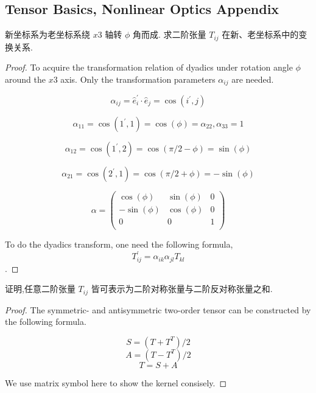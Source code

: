 \subsection{Tensor Basics, Nonlinear Optics Appendix}

\begin{exercise}
新坐标系为老坐标系绕 $x3$ 轴转 $\phi$ 角而成. 求二阶张量 $T_{ij}$ 在新、老坐标系中的变换关系.

\end{exercise}

\begin{proof}
    To acquire the transformation relation of dyadics under rotation angle $\phi$ around the $x3$ axis. Only the transformation parameters $\alpha_{ij}$ are needed. 
    
    $$
    \alpha_{i j}=\hat{e}_{i}^{\prime} \cdot \hat{e}_{j}=\cos \left(i^{\prime}, j\right)
    $$

    $$
    \alpha_{1 1}=\cos (1^{\prime}, 1)=\cos (\phi) = \alpha_{2 2}, \alpha_{3 3} =1
    $$
    
    $$
    \alpha_{1 2}=\cos (1^{\prime}, 2)=\cos (\pi/2-\phi) = \sin (\phi)
    $$

    $$
    \alpha_{2 1}=\cos (2^{\prime}, 1)=\cos (\pi/2+\phi) = -\sin (\phi)
    $$

    $$
    \alpha =
    \left ( 
        \begin{matrix}
        \cos (\phi) & \sin (\phi) & 0\\
        -\sin (\phi) & \cos (\phi) & 0\\
        0 & 0 & 1 \\
        \end{matrix}
    \right )
    $$

    To do the dyadics transform, one need the following formula,
    $$
    T_{i j}^{\prime}=\alpha_{i k} \alpha_{j l} T_{k l}
    $$.
\end{proof}

\begin{exercise}
    证明,任意二阶张量 $T_{ij}$ 皆可表示为二阶对称张量与二阶反对称张量之和.
\end{exercise}

\begin{proof}
    The symmetric- and antisymmetric two-order tensor can be constructed by the following formula.

    $$ S = (T + T^{T})/2 $$
    $$ A = (T - T^{T})/2 $$
    $$ T = S+A $$

    We use matrix symbol here to show the kernel consisely.

\end{proof}

